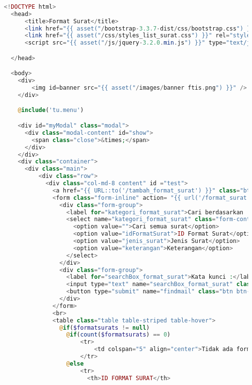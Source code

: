 \begin{lstlisting}[language=php,basicstyle=\tiny,caption=Format surat]
	
<!DOCTYPE html>
  <head>
      <title>Format Surat</title>
      <link href="{{ asset("/bootstrap-3.3.7-dist/css/bootstrap.css") }}" rel="stylesheet" type="text/css" />
      <link href="{{ asset("/css/styles_list_surat.css") }}" rel="stylesheet" type="text/css" />
      <script src="{{ asset("/js/jquery-3.2.0.min.js") }}" type="text/javascript"></script>

  </head>

  <body>
    <div>
        <img id=banner src="{{ asset("/images/banner ftis.png") }}" />
    </div>

    @include('tu.menu')

    <div id="myModal" class="modal">
      <div class="modal-content" id="show">
        <span class="close">&times;</span>
      </div>
    </div>
    <div class="container">
      <div class="main">
          <div class="row">
            <div class="col-md-8 content" id ="test">
              <a href="{{ URL::to('/tambah_format_surat') }}" class="btn btn-default">Tambah Format Surat</a>
              <form class="form-inline" action= "{{ url('/format_surat') }}" method="get">
                <div class="form-group">
                  <label for="kategori_format_surat">Cari berdasarkan :</label><br>
                  <select name="kategori_format_surat" class="form-control">
                    <option value="">Cari semua surat</option>
                    <option value="idFormatSurat">ID Format Surat</option>
                    <option value="jenis_surat">Jenis Surat</option>
                    <option value="keterangan">Keterangan</option>
                  </select>
                </div>
                <div class="form-group">
                  <label for="searchBox_format_surat">Kata kunci :</label><br>
                  <input type="text" name="searchBox_format_surat" class="form-control" size = "65">
                  <button type="submit" name="findmail" class="btn btn-primary">Cari format surat</button>
                </div>
              </form>
              <br>
              <table class="table table-striped table-hover">
                @if($formatsurats != null)
                  @if(count($formatsurats) == 0)
                      <tr>
                          <td colspan="5" align="center">Tidak ada format surat ...</td>
                      </tr>
                  @else
                      <tr>
                        <th>ID FORMAT SURAT</th>

\end{lstlisting}
